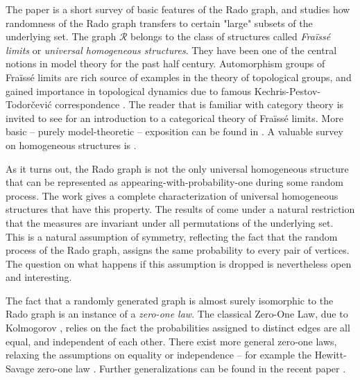 \documentclass{amsart}
\theoremstyle{plain}
\theoremstyle{definition}
\theoremstyle{remark}
\numberwithin{equation}{section}
\newcommand{\RR}{\mathcal{R}}
\begin{document}
The paper \cite{Cameron_revisited} is a short survey of basic features of the Rado graph, and \cite{brian2018subsets} studies how randomness of the Rado graph transfers to certain "large" subsets of the underlying set.
%
The graph $\RR$ belongs to the class of structures called \emph{Fra\"iss\'e limits} or \emph{universal homogeneous structures}. They have been one of the central notions
in model theory for the past half century. Automorphism groups of Fra\"iss\'e limits are rich source of examples in the theory of topological groups, and gained importance in topological dynamics due to famous Kechris-Pestov-Todor\v{c}evi\'c correspondence \cite{KPT}. The reader that is familiar with category theory is invited to see \cite{Kubis} for an introduction to a categorical theory of Fra\"iss\'e limits. More basic -- purely model-theoretic -- exposition can be found in \cite{Hodges}. A valuable survey
on homogeneous structures is \cite{Macpherson}. 

As it turns out, the Rado graph is not the only universal homogeneous structure that can be represented as appearing-with-probability-one during some random process.
The work \cite{ackerman2016invariant} gives a complete characterization of universal homogeneous structures that have this property. The results of \cite{ackerman2016invariant} come under a natural restriction that the measures are invariant under all permutations of the underlying set. This is a natural assumption of symmetry, reflecting the fact that the random process of the Rado graph, assigns the same probability to every pair of vertices. The
question on what happens if this assumption is dropped is nevertheless open and interesting.

The fact that a randomly generated graph is almost surely isomorphic to the Rado graph is an instance of a \emph{zero-one law}. The classical Zero-One Law, due to Kolmogorov \cite{kolmogorov2018foundations},
relies on the fact the probabilities assigned to distinct edges are all equal, and independent of each other. There exist more general zero-one laws, relaxing the
assumptions on equality or independence -- for example the Hewitt-Savage zero-one law \cite{hewitt1955symmetric}. Further generalizations can be found in the recent paper \cite{ayach2025zero}.
\end{document}
